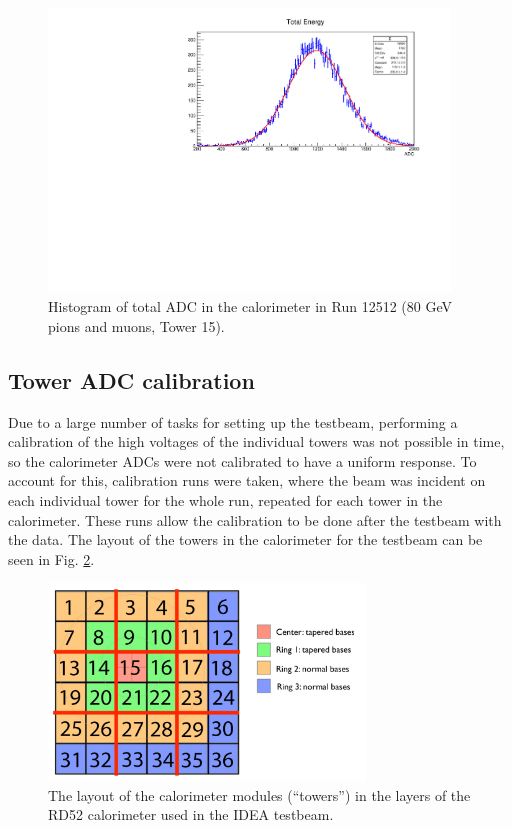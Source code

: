 \begin{figure}[p]
	\centering
	\includegraphics[width=0.95\textwidth]{../Pictures/IDEA/totalEnergy80GeV.pdf}
	\caption{Histogram of total \acrshort{ADC} in the calorimeter in Run 12512 (80 GeV pions and muons, Tower 15).}
	\label{figure:testbeam/results/total-adc-80}
\end{figure}

\subsection{Tower ADC calibration}
\label{section:tower-calibration}
Due to a large number of tasks for setting up the testbeam, performing a calibration of the high voltages of the individual towers was not possible in time, so the calorimeter \acrshort{ADC}s were not calibrated to have a uniform response. To account for this, calibration runs were taken, where the beam was incident on each individual tower for the whole run, repeated for each tower in the calorimeter. These runs allow the calibration to be done after the testbeam with the data. The layout of the towers in the calorimeter for the testbeam can be seen in Fig. \ref{figure:testbeam/results/tower-layout}.

\begin{figure}[h]
	\centering
	\includegraphics[width=0.75\textwidth]{../Pictures/IDEA/RD52-towers.jpg}
	\caption{The layout of the calorimeter modules (``towers'') in the layers of the RD52 calorimeter used in the \acrshort{IDEA} testbeam.}
	\label{figure:testbeam/results/tower-layout}
\end{figure}

